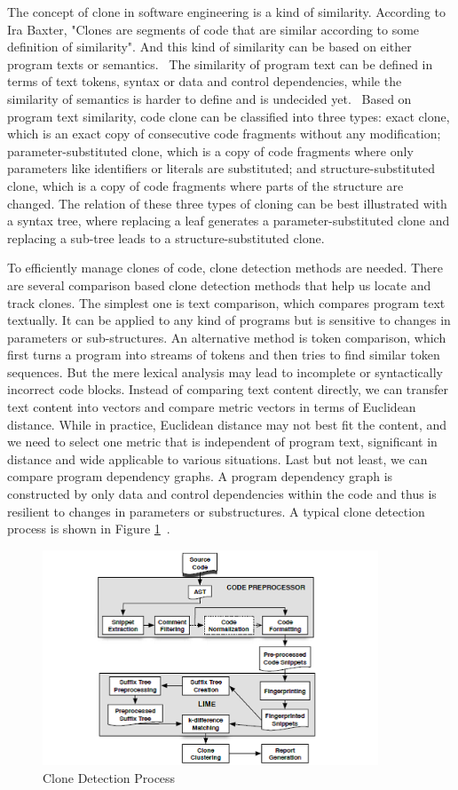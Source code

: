 \documentclass{acm_proc_article-sp}
\begin{document}
The concept of clone in software engineering is a kind of similarity. According to Ira Baxter, "Clones are segments of code that are similar according to some definition of similarity". And this kind of similarity can be based on either program texts or semantics.~\cite{frontiers} The similarity of program text can be defined in terms of text tokens, syntax or data and control dependencies, while the similarity of semantics is harder to define and is undecided yet.~\cite{frontiers} Based on program text similarity, code clone can be classified into three types: exact clone, which is an exact copy of consecutive code fragments without any modification; parameter-substituted clone, which is a copy of code fragments where only parameters like identifiers or literals are substituted; and structure-substituted clone, which is a copy of code fragments where parts of the structure are changed. The relation of these three types of cloning can be best illustrated with a syntax tree, where replacing a leaf generates a parameter-substituted clone and replacing a sub-tree leads to a structure-substituted clone. 

To efficiently manage clones of code, clone detection methods are needed. There are several comparison based clone detection methods that help us locate and track clones. The simplest one is text comparison, which compares program text textually. It can be applied to any kind of programs but is sensitive to changes in parameters or sub-structures. An alternative method is token comparison, which first turns a program into streams of tokens and then tries to find similar token sequences. But the mere lexical analysis may lead to incomplete or syntactically incorrect code blocks. Instead of comparing text content directly, we can transfer text content into vectors and compare metric vectors in terms of Euclidean distance. While in practice, Euclidean distance may not best fit the content, and we need to select one metric that is independent of program text, significant in distance and wide applicable to various situations. Last but not least, we can compare program dependency graphs. A program dependency graph is constructed by only data and control dependencies within the code and thus is resilient to changes in parameters or substructures. A typical clone detection process is shown in Figure \ref{fig:detect}~\cite{towards_tool}.

 \begin{figure}[h]
 \centering
\includegraphics[width=10cm]{clone_detection}
\caption{Clone Detection Process}
    \label{fig:detect}
\end{figure}
\end{document}

